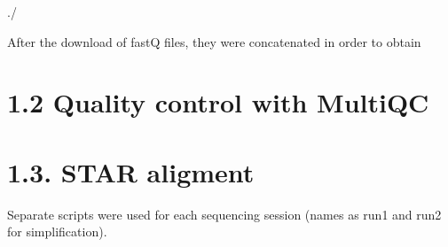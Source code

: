 \documentclass[
  letterpaper,
  DIV=11,
  numbers=noendperiod]{scrreprt}
\newenvironment{Shaded}{\begin{snugshade}}{\end{snugshade}}
\newcommand{\NormalTok}[1]{\textcolor[rgb]{0.00,0.23,0.31}{#1}}
\begin{document}
\begin{Shaded}
\end{Shaded}

\begin{Shaded}
\begin{Highlighting}[]
\NormalTok{./}
\end{Highlighting}
\end{Shaded}

After the download of fastQ files, they were concatenated in order to
obtain

\section{1.2 Quality control with
MultiQC}\label{quality-control-with-multiqc}

\begin{Shaded}
\begin{Highlighting}[]



\end{Highlighting}
\end{Shaded}

\section{1.3. STAR aligment}\label{star-aligment}

Separate scripts were used for each sequencing session (names as run1
and run2 for simplification).
\end{document}
